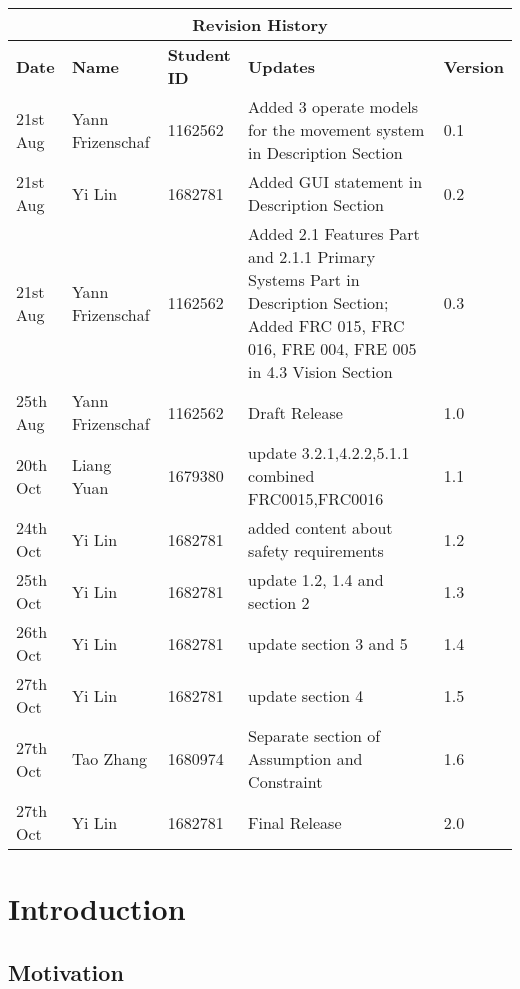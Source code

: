 \documentclass[12pt]{article}
\begin{document}
\begin{table}
\begin{tabular}{ | p{}| p{}| p{}| p{}|p{}|}
\hline
\multicolumn{5}{|c|}{\textbf{Revision History}}\\
\hline
\textbf \textbf{Date} &  \textbf\textbf{Name} &  \textbf\textbf{Student ID} & \textbf\textbf {Updates} & \textbf\textbf{Version} \\
\hline
21st Aug & Yann Frizenschaf & 1162562 & Added 3 operate models for the movement system in Description Section & 0.1\\
\hline
21st Aug & Yi Lin & 1682781 & Added GUI statement in Description Section & 0.2\\
\hline
21st Aug & Yann Frizenschaf & 1162562 & Added 2.1 Features Part and 2.1.1 Primary Systems Part in Description Section; Added FRC 015, FRC 016, FRE 004, FRE 005 in 4.3 Vision Section & 0.3\\
\hline
 25th Aug & Yann Frizenschaf & 1162562 & Draft Release &1.0\\
\hline
 20th Oct & Liang Yuan & 1679380 & update 3.2.1,4.2.2,5.1.1 combined FRC0015,FRC0016 &1.1\\
\hline
24th Oct &Yi Lin&1682781  &added content about safety requirements  & 1.2\\
\hline
25th Oct &Yi Lin&1682781  &update 1.2, 1.4 and section 2  & 1.3\\
\hline
 26th Oct&Yi Lin  &1682781  &update section 3 and 5 & 1.4\\
\hline
 27th Oct& Yi Lin &1682781  &update section 4 & 1.5\\
\hline
27th Oct& Tao Zhang &1680974  &Separate section of Assumption and Constraint & 1.6\\
\hline
27th Oct& Yi Lin &1682781  &Final Release & 2.0\\
\hline
\end{tabular}

\end{table} 

\clearpage 

\pagebreak
\tableofcontents
\pagebreak


\section{Introduction}

\subsection{Motivation}
\end{document}
